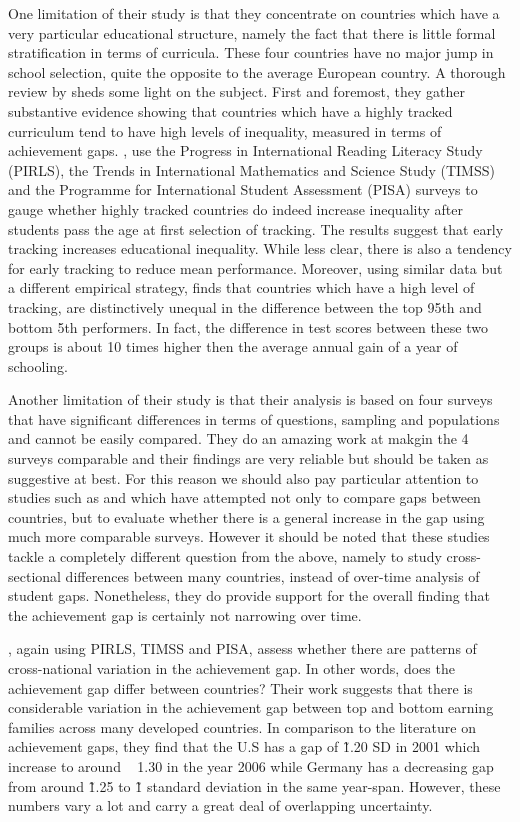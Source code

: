 \documentclass[11pt, a4paper]{article}\usepackage[]{graphicx}\usepackage[]{color}
\begin{document}
One limitation of their study is that they concentrate on countries which have a very particular educational structure, namely the fact that there is little formal stratification in terms of curricula. These four countries have no major jump in school selection, quite the opposite to the average European country. A thorough review by \citet{werfhorst_mijs} sheds some light on the subject. First and foremost, they gather substantive evidence showing that countries which have a highly tracked curriculum tend to have high levels of inequality, measured in terms of achievement gaps. \citet{hanushek_woesmann_tracking}, use the Progress in International Reading Literacy Study (PIRLS), the Trends in International Mathematics and Science Study (TIMSS) and the Programme for International Student Assessment (PISA) surveys to gauge whether highly tracked countries do indeed increase inequality after students pass the age at first selection of tracking. The results suggest that early tracking increases educational inequality. While less clear, there is also a tendency for early tracking to reduce mean performance. Moreover, \citet{micklewright} using similar data but a different empirical strategy, finds that countries which have a high level of tracking, are distinctively unequal in the difference between the top 95th and bottom 5th performers. In fact, the difference in test scores between these two groups is about 10 times higher then the average annual gain of a year of schooling.

Another limitation of their study is that their analysis is based on four surveys that have significant differences in terms of questions, sampling and populations and cannot be easily compared. They do an amazing work at makgin the 4 surveys comparable and their findings are very reliable but should be taken as suggestive at best. For this reason we should also pay particular attention to studies such as \citet{anna2016} and \citet{anna2016_global} which have attempted not only to compare gaps between countries, but to evaluate whether there is a general increase in the gap using much more comparable surveys. However it should be noted that these studies tackle a completely different question from the above, namely to study cross-sectional differences between many countries, instead of over-time analysis of student gaps. Nonetheless, they do provide support for the overall finding that the achievement gap is certainly not narrowing over time.

\citet{anna2016}, again using PIRLS, TIMSS and PISA, assess whether there are patterns of cross-national variation in the achievement gap. In other words, does the achievement gap differ between countries? Their work suggests that there is considerable variation in the achievement gap between top and bottom earning families across many developed countries. In comparison to the literature on achievement gaps, they find that the U.S has a gap of \~  1.20 SD in 2001 which increase to around ~ 1.30 in the year 2006 while Germany has a decreasing gap from around \~  1.25 to \~  1 standard deviation in the same year-span. However, these numbers vary a lot and carry a great deal of overlapping uncertainty.
\end{document}
